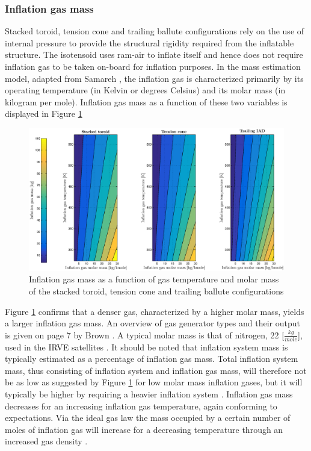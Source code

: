 \subsubsection{Inflation gas mass}
Stacked toroid, tension cone and trailing ballute configurations rely on the use of internal pressure to provide the structural rigidity required from the inflatable structure. The isotensoid uses ram-air to inflate itself and hence does not require inflation gas to be taken on-board for inflation purposes. In the mass estimation model, adapted from Samareh \cite{Samareh2011}, the inflation gas is characterized primarily by its operating temperature (in Kelvin or degrees Celsius) and its molar mass (in kilogram per mole). Inflation gas mass as a function of these two variables is displayed in Figure \ref{fig:inflmass}

\begin{figure}[H]
\hspace{-5mm}
\includegraphics[width = 1.0\textwidth]{Figure/gas_temp_mass.eps}
\caption{Inflation gas mass as a function of gas temperature and molar mass of the stacked toroid, tension cone and trailing ballute configurations}
\label{fig:inflmass}
\end{figure}

Figure \ref{fig:inflmass} confirms that a denser gas, characterized by a higher molar mass, yields a larger inflation gas mass. An overview of gas generator types and their output is given on page 7 by Brown \cite{Brown2003}. A typical molar mass is that of nitrogen, 22 [$\frac{kg}{mole}$], used in the IRVE satellites \cite{Dillman2012}. It should be noted that inflation system mass is typically estimated as a percentage of inflation gas mass. Total inflation system mass, thus consisting of inflation system and inflation gas mass, will therefore not be as low as suggested by Figure \ref{fig:inflmass} for low molar mass inflation gases, but it will typically be higher by requiring a heavier inflation system \cite{Brown2003}. Inflation gas mass decreases for an increasing inflation gas temperature, again conforming to expectations. Via the ideal gas law the mass occupied by a certain number of moles of inflation gas will increase for a decreasing temperature through an increased gas density \cite{AndersonJr.2007}.
